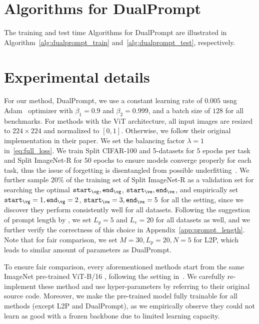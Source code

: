 \documentclass[runningheads]{llncs}
\newcommand{\sayna}[1]{\textcolor{blue}{Sayna: #1}}
\newcommand{\zizhaoz}[1]{\textcolor{green}{Zizhao: #1}}
\newcommand{\method}{DualPrompt\xspace}
\def\pfunc{{f_{\text{prompt}}}}
\def \iep{\texttt{start}_{\ve}}
\def \jep{\texttt{end}_{\ve}}
\def \igp{\texttt{start}_{\vg}}
\def \jgp{\texttt{end}_{\vg}}
\begin{document}
\section{Algorithms for \method} \label{app:algorithm}
The training and test time Algorithms for \method are illustrated in Algorithm~\ref{alg:dualprompt_train} and~\ref{alg:dualprompt_test}, respectively.

\section{Experimental details} \label{app:exp_details}
For our method, \method, we use a constant learning rate of $0.005$ usng Adam~\cite{kingma2014adam} optimizer with $\beta_1= 0.9$ and $\beta_2=0.999$, and a batch size of $128$ for all benchmarks. For methods with the ViT architecture, all input images are resized to $224\times224$ and normalized to $[0, 1]$. Otherwise, we follow their original implementation in their paper. We set the balancing factor $\lambda = 1$ in~\eqref{eq:full_loss}. We train Split CIFAR-100 and 5-datasets for $5$ epochs per task and Split ImageNet-R for $50$ epochs to ensure models converge properly for each task, thus the issue of forgetting is disentangled from possible underfitting~\cite{buzzega2020dark}. We further sample $20\%$ of the training set of Split ImageNet-R as a validation set for searching the optimal $\igp, \jgp$, $\iep, \jep$, and empirically set $\igp=1, \jgp=2$, $\iep=3, \jep=5$ for all the setting, since we discover they perform consistently well for all datasets. Following the suggestion of prompt length by \cite{wang2021learning}, we set $L_g=5$ and $L_e=20$ for all datasets as well, and we further verify the correctness of this choice in Appendix~\ref{app:prompt_length}. Note that for fair comparison, we set $M=30, L_p=20, N=5$ for L2P, which leads to similar amount of parameters as \method. %

To ensure fair comparison, every aforementioned methods start from the same ImageNet pre-trained ViT-B/16 \cite{vit}, following the setting in~\cite{wang2021learning}. We carefully re-implement these method and use hyper-parameters by referring to their original source code. Moreover, we make the pre-trained model fully trainable for all methods (except L2P and \method), as we empirically observe they could not learn as good with a frozen backbone due to limited learning capacity. 
\end{document}
